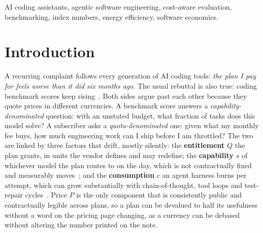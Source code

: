 \documentclass[conference]{IEEEtran}
\theoremstyle{plain}
\theoremstyle{definition}
\begin{document}
\begin{IEEEkeywords}
AI coding assistants, agentic software engineering, cost-aware evaluation,
benchmarking, index numbers, energy efficiency, software economics.
\end{IEEEkeywords}

\section{Introduction}
\label{sec:scope}

A recurring complaint follows every generation of AI coding tools: \emph{the
plan I pay for feels worse than it did six months ago}. The usual rebuttal is
also true: coding benchmark scores keep
rising~\cite{jimenez2024swebench,jain2025livecodebench}. Both sides argue past
each other because they quote prices in different currencies. A benchmark
score answers a \emph{capability-denominated} question: with an unstated
budget, what fraction of tasks does this model solve? A subscriber asks a
\emph{quota-denominated} one: given what my monthly fee buys, how much
engineering work can I ship before I am throttled? The two are linked by three
factors that drift, mostly silently: the \textbf{entitlement} $Q$ the plan
grants, in units the vendor defines and may redefine; the \textbf{capability}
$s$ of whichever model the plan routes to on the day, which is not
contractually fixed and measurably moves~\cite{chen2024drift}; and the
\textbf{consumption} $c$ an agent harness burns per attempt, which can grow
substantially with chain-of-thought, tool loops and test-repair
cycles~\cite{wei2022cot,snell2024scaling,yang2024sweagent}. Price $P$ is the only
component that is consistently public and contractually legible across plans,
so a plan can be devalued to half its usefulness
without a word on the pricing page changing, as a currency can be debased
without altering the number printed on the note.
\end{document}
